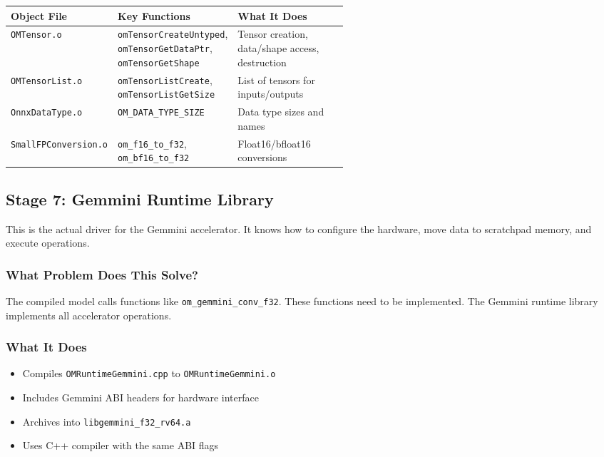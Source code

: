 \documentclass[12pt,a4paper]{article}
\begin{document}
\begin{table}[H]
\centering
\small
\begin{tabularx}{\linewidth}{@{}L{0.25\linewidth}L{0.30\linewidth}Y@{}}
\toprule
\textbf{Object File} & \textbf{Key Functions} & \textbf{What It Does} \\
\midrule
\texttt{OMTensor.o} & \texttt{omTensorCreateUntyped}, \texttt{omTensorGetDataPtr}, \texttt{omTensorGetShape} & Tensor creation, data/shape access, destruction \\
\texttt{OMTensorList.o} & \texttt{omTensorListCreate}, \texttt{omTensorListGetSize} & List of tensors for inputs/outputs \\
\texttt{OnnxDataType.o} & \texttt{OM\_DATA\_TYPE\_SIZE} & Data type sizes and names \\
\texttt{SmallFPConversion.o} & \texttt{om\_f16\_to\_f32}, \texttt{om\_bf16\_to\_f32} & Float16/bfloat16 conversions \\
\bottomrule
\end{tabularx}
\end{table}

\subsection{Stage 7: Gemmini Runtime Library}

\begin{analogyenv}
This is the actual driver for the Gemmini accelerator. It knows how to configure the hardware, move data to scratchpad memory, and execute operations.
\end{analogyenv}

\subsubsection{What Problem Does This Solve?}
The compiled model calls functions like \texttt{om\_gemmini\_conv\_f32}. These functions need to be implemented. The Gemmini runtime library implements all accelerator operations.

\subsubsection{What It Does}
\begin{itemize}
  \item Compiles \texttt{OMRuntimeGemmini.cpp} to \texttt{OMRuntimeGemmini.o}
  \item Includes Gemmini ABI headers for hardware interface
  \item Archives into \texttt{libgemmini\_f32\_rv64.a}
  \item Uses C++ compiler with the same ABI flags
\end{itemize}
\end{document}
